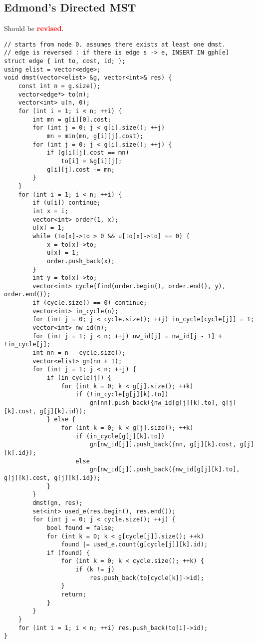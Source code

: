 \documentclass[landscape, 8pt, a4paper, oneside, twocolumn]{extarticle}
\newcommand{\revised}{Should be \textcolor{red}{\textbf{revised}}.}
\begin{document}
\subsection {Edmond's Directed MST}
\revised
\begin{verbatim}
// starts from node 0. assumes there exists at least one dmst.
// edge is reversed : if there is edge s -> e, INSERT IN gph[e]
struct edge { int to, cost, id; };
using elist = vector<edge>;
void dmst(vector<elist> &g, vector<int>& res) {
	const int n = g.size();
	vector<edge*> to(n);
	vector<int> u(n, 0);
	for (int i = 1; i < n; ++i) {
		int mn = g[i][0].cost;
		for (int j = 0; j < g[i].size(); ++j)
			mn = min(mn, g[i][j].cost);
		for (int j = 0; j < g[i].size(); ++j) {
			if (g[i][j].cost == mn)
				to[i] = &g[i][j];
			g[i][j].cost -= mn;
		}
	}
	for (int i = 1; i < n; ++i) {
		if (u[i]) continue;
		int x = i;
		vector<int> order(1, x);
		u[x] = 1;
		while (to[x]->to > 0 && u[to[x]->to] == 0) {
			x = to[x]->to;
			u[x] = 1;
			order.push_back(x);
		}
		int y = to[x]->to;
		vector<int> cycle(find(order.begin(), order.end(), y), order.end());
		if (cycle.size() == 0) continue;
		vector<int> in_cycle(n);
		for (int j = 0; j < cycle.size(); ++j) in_cycle[cycle[j]] = 1;
		vector<int> nw_id(n);
		for (int j = 1; j < n; ++j) nw_id[j] = nw_id[j - 1] + !in_cycle[j];
		int nn = n - cycle.size();
		vector<elist> gn(nn + 1);
		for (int j = 1; j < n; ++j) {
			if (in_cycle[j]) {
				for (int k = 0; k < g[j].size(); ++k)
					if (!in_cycle[g[j][k].to])
						gn[nn].push_back({nw_id[g[j][k].to], g[j][k].cost, g[j][k].id});
			} else {
				for (int k = 0; k < g[j].size(); ++k)
					if (in_cycle[g[j][k].to])
						gn[nw_id[j]].push_back({nn, g[j][k].cost, g[j][k].id});
					else
						gn[nw_id[j]].push_back({nw_id[g[j][k].to], g[j][k].cost, g[j][k].id});
			}
		}
		dmst(gn, res);
		set<int> used_e(res.begin(), res.end());
		for (int j = 0; j < cycle.size(); ++j) {
			bool found = false;
			for (int k = 0; k < g[cycle[j]].size(); ++k)
				found |= used_e.count(g[cycle[j]][k].id);
			if (found) {
				for (int k = 0; k < cycle.size(); ++k) {
					if (k != j)
						res.push_back(to[cycle[k]]->id);
				}
				return;
			}
		}
	}
	for (int i = 1; i < n; ++i) res.push_back(to[i]->id);
}
\end{verbatim}
\end{document}
